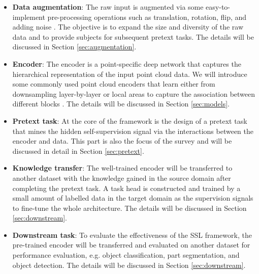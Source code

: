 \documentclass[a4paper,fleqn]{cas-dc}
\begin{document}
\begin{itemize}
    \item \textbf{Data augmentation}: The raw input is augmented via some easy-to-implement pre-processing operations such as translation, rotation, flip, and adding noise \citep{zhang2022point}. The objective is to expand the size and diversity of the raw data and to provide subjects for subsequent pretext tasks. The details will be discussed in Section \ref{sec:augmentation}. 
    \item \textbf{Encoder}: The encoder is a point-specific deep network that captures the hierarchical representation of the input point cloud data. We will introduce some commonly used point cloud encoders that learn either from downsampling layer-by-layer \citep{qi2017pointnet,qi2017pointnet++} or  local areas to capture the association between different blocks \citep{YinZhou2018VoxelNetEL,wang2019dynamic}. The details will be discussed in Section \ref{sec:models}. 
    \item \textbf{Pretext task}: At the core of the framework is the design of a pretext task that mines the hidden self-supervision signal via the interactions between the encoder and data. This part is also the focus of the survey and will be discussed in detail in Section \ref{sec:pretext}.
    \item \textbf{Knowledge transfer}: The well-trained encoder will be transferred to another dataset with the knowledge gained in the source domain after completing the pretext task. A task head is constructed and trained by a small amount of labelled data in the target domain as the supervision signals to fine-tune the whole architecture. The details will be discussed in Section \ref{sec:downstream}.
    \item \textbf{Downstream task}: To evaluate the effectiveness of the SSL framework, the pre-trained encoder will be transferred and evaluated on another dataset for performance evaluation, e.g. object classification, part segmentation, and object detection. The details will be discussed in Section \ref{sec:downstream}.
\end{itemize}
\end{document}
